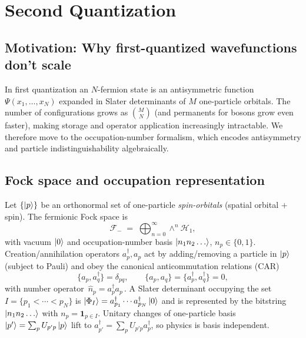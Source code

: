 


\section{Second Quantization}

\subsection{Motivation: Why first-quantized wavefunctions don’t scale}
In first quantization an $N$-fermion state is an antisymmetric function
$\Psi(x_1,\dots,x_N)$ expanded in Slater determinants of $M$ one-particle orbitals.
The number of configurations grows as $\binom{M}{N}$ (and permanents for bosons grow even faster),
making storage and operator application increasingly intractable. We therefore move to the
occupation-number formalism, which encodes antisymmetry and particle indistinguishability
algebraically.

\subsection{Fock space and occupation representation}
Let $\{\ket{p}\}$ be an orthonormal set of one-particle \emph{spin-orbitals} (spatial orbital $+\,$spin).
The fermionic Fock space is
\[
\mathcal F_- \;=\; \bigoplus_{n=0}^{\infty} \wedge^n \mathcal H_1,
\]
with vacuum $\ket{0}$ and occupation-number basis
$\ket{n_1 n_2 \dots}$, $n_p\in\{0,1\}$. Creation/annihilation operators $a_p^\dagger, a_p$
act by adding/removing a particle in $\ket{p}$ (subject to Pauli) and obey the canonical
anticommutation relations (CAR)
\[
\{a_p, a_q^\dagger\}=\delta_{pq},\qquad \{a_p,a_q\}=\{a_p^\dagger,a_q^\dagger\}=0,
\]
with number operator $\,\hat n_p=a_p^\dagger a_p\,$. A Slater determinant occupying the set
$I=\{p_1<\cdots<p_N\}$ is $\ket{\Phi_I}=a_{p_1}^\dagger\cdots a_{p_N}^\dagger\ket{0}$ and is
represented by the bitstring $\ket{n_1 n_2 \dots}$ with $n_p=\mathbf 1_{p\in I}$.
Unitary changes of one-particle basis $\ket{p'}=\sum_p U_{p'p}\ket{p}$ lift to
$a_{p'}^\dagger=\sum_p U_{p'p} a_p^\dagger$, so physics is basis independent.

